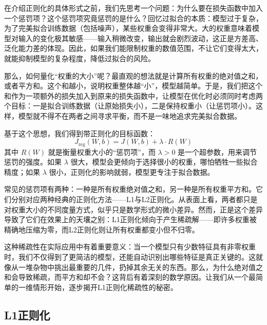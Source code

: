 \documentclass[lang=cn,zihao=-4,a4paper,fontset=windows]{beautybook}
\begin{document}
在介绍正则化的具体形式之前，我们先思考一个问题：为什么要在损失函数中加入一个惩罚项？这个惩罚项究竟惩罚的是什么？回忆过拟合的本质：模型过于复杂，为了完美拟合训练数据（包括噪声），某些权重会变得非常大。大的权重意味着模型对输入的变化极其敏感——输入稍微改变，输出就会剧烈波动，这正是方差高、泛化能力差的体现。因此，如果我们能限制权重的数值范围，不让它们变得太大，就能抑制模型的复杂程度，降低过拟合的风险。

那么，如何量化“权重的大小”呢？最直观的想法就是计算所有权重的绝对值之和，或者平方和。这个和越小，说明权重整体越“小”，模型越简单。于是，我们把这个和作为一项额外的损失加入到原来的损失函数中，让模型在优化时必须同时考虑两个目标：一是拟合训练数据（让原始损失小），二是保持权重小（让惩罚项小）。这样，模型就不得不在两者之间寻求平衡，而不是一味地追求完美拟合数据。

基于这个思想，我们得到带正则化的目标函数：
\[
J_{\text{reg}}(W, b) = J(W, b) + \lambda \cdot R(W)
\]
其中 \(R(W)\) 就是衡量权重大小的“惩罚项”，而 \(\lambda > 0\) 是一个超参数，用来调节惩罚的强度。如果 \(\lambda\) 很大，模型会更倾向于选择很小的权重，哪怕牺牲一些拟合精度；如果 \(\lambda\) 很小，正则化的影响就弱，模型更专注于拟合数据。

常见的惩罚项有两种：一种是所有权重绝对值之和，另一种是所有权重平方和。它们分别对应两种经典的正则化方法——L1与L2正则化。从表面上看，两者都只是对权重大小的不同度量方式，似乎只是数学形式的微小差异。然而，正是这个差异导致了它们在效果上的天壤之别：L1正则化倾向于产生稀疏解——即许多权重被精确地压缩为零，而L2正则化则让所有权重都变小但不归零。

这种稀疏性在实际应用中有着重要意义：当一个模型只有少数特征具有非零权重时，我们不仅得到了更简洁的模型，还能自动识别出哪些特征是真正关键的。这就像从一堆杂物中挑出最重要的几件，扔掉其余无关的东西。那么，为什么绝对值之和会导致稀疏，而平方和却不会？这背后有着深刻的数学原因。让我们从一个最简单的一维情形开始，逐步揭开L1正则化稀疏性的秘密。

\subsection{L1正则化}
\end{document}

